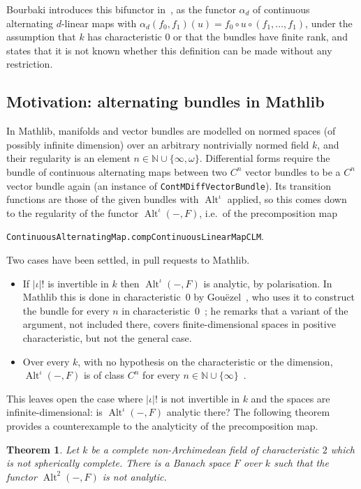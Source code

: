 \documentclass[11pt]{amsart}
\newtheorem{theorem}{Theorem}
\theoremstyle{remark}
\newcommand{\kk}{k}
\newcommand{\N}{\mathbb{N}}
\newcommand{\Alt}{\operatorname{Alt}}
\newcommand{\abs}[1]{\lvert #1\rvert}
\newcommand{\1}{\mathbf{1}}
\begin{document}
Bourbaki introduces this bifunctor in~\cite[n\textsuperscript{o}~7.8]{Bou}, as the functor $\alpha_d$ of continuous alternating
$d$-linear maps with $\alpha_d(f_0,f_1)(u)=f_0\circ u\circ(f_1,\dots,f_1)$, under the assumption that $\kk$ has characteristic $0$ or
that the bundles have finite rank, and states that it is not known whether this definition can be made without any restriction.

\subsection*{Motivation: alternating bundles in Mathlib}
In Mathlib, manifolds and vector bundles are modelled on normed spaces (of possibly infinite dimension) over an
arbitrary nontrivially normed field $\kk$, and their regularity is an element $n\in\N\cup\{\infty,\omega\}$. Differential forms require the bundle of continuous alternating maps between two $C^n$ vector
bundles to be a $C^n$ vector bundle again (an instance of \texttt{ContMDiffVectorBundle}). Its transition functions are
those of the given bundles with $\Alt^\iota$ applied, so this comes down to the regularity of the functor $\Alt^\iota(-,F)$,
i.e.\ of the precomposition map
\begin{center}\texttt{ContinuousAlternatingMap.compContinuousLinearMapCLM}.\end{center}
Two cases have been settled, in pull requests to Mathlib.
\begin{itemize}
\item If $\abs\iota!$ is invertible in $\kk$ then $\Alt^\iota(-,F)$ is analytic, by polarisation. In Mathlib this is done in
characteristic~$0$ by Gou\"ezel~\cite{G1}, who uses it to construct the bundle for every $n$ in
characteristic~$0$~\cite{G2}; he remarks that a variant of the argument, not included there, covers finite-dimensional
spaces in positive characteristic, but not the general case.
\item Over every $\kk$, with no hypothesis on the characteristic or the dimension, $\Alt^\iota(-,F)$ is of class $C^n$ for every
$n\in\N\cup\{\infty\}$~\cite{PR}.
\end{itemize}
This leaves open the case where $\abs\iota!$ is not invertible in $\kk$ and the spaces are infinite-dimensional: is
$\Alt^\iota(-,F)$ analytic there? The following theorem provides a counterexample to the analyticity of the precomposition map.

\begin{theorem}\label{thm:false}
Let $\kk$ be a complete non-Archimedean field of characteristic $2$ which is not spherically complete. There is a Banach
space $F$ over $\kk$ such that the functor $\Alt^2(-,F)$ is not analytic.
\end{theorem}
\end{document}
